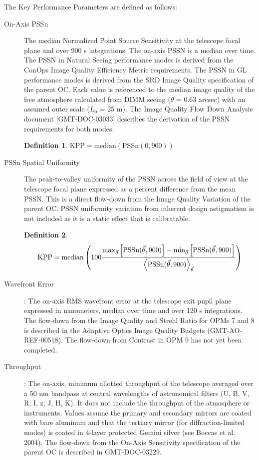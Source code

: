 \documentclass{gmto}
\newtheorem{theorem}{Definition}
\def\median{\ensuremath{\mathrm{median}}}
\begin{document}
The Key Performance Parameters are defined as follows: 
\begin{description}
\item[On-Axis PSSn] The median Normalized Point Source Sensitivity at the telescope focal plane and over 900 s integrations. The
  on-axis PSSN is a median over time. The PSSN in Natural Seeing performance
  modes is derived from the ConOps Image Quality Efficiency Metric requirements.
  The PSSN in GL performance modes is derived from the SRD Image Quality
  specification of the parent OC. Each value is referenced to the median image
  quality of the free atmosphere calculated from DIMM seeing ($\theta$ = 0.63
  arcsec) with an assumed outer scale ($L_0$ = 25 m). The Image Quality Flow
  Down Analysis document $[$GMT-DOC-03033$]$ describes the derivation of the
  PSSN requirements for both modes.
  \begin{theorem}
    $\mathrm{KPP} = \median\left( \mathrm{PSSn}(0,900) \right)$
  \end{theorem}
  
\item[PSSn Spatial Uniformity] The peak-to-valley uniformity of the PSSN across the field of view at the telescope focal plane expressed as a percent difference from the mean PSSN. This is a direct flow-down from the Image Quality Variation of the parent OC. PSSN uniformity variation from inherent design astigmatism is not included as it is a static effect that is calibratable.  
  \begin{theorem}
    \begin{displaymath}
    \mathrm{KPP} = \median\left( 100
      {\max_{\vec\theta}\left[\mathrm{PSSn}(\vec\theta,900)\right]-\min_{\vec\theta}\left[\mathrm{PSSn}(\vec\theta,900)\right]\over\left\langle
       \mathrm{PSSn}(\vec\theta,900) \right\rangle_{\vec\theta}} \right)
    \end{displaymath}
  \end{theorem}

\item[Wavefront Error]: The on-axis RMS wavefront error at the telescope exit pupil plane expressed in nanometers, median over time and over 120 s integrations. The flow-down from the Image Quality and Strehl Ratio for OPMs 7 and 8 is described in the Adaptive Optics Image Quality Budgets (GMT-AO-REF-00518). The flow-down from Contrast in OPM 9 has not yet been completed.  

\item[Throughput]: The on-axis, minimum allotted throughput of the telescope averaged over a 50 nm bandpass at central wavelengths of astronomical filters (U, B, V, R, I, z, J, H, K). It does not include the throughput of the atmosphere or instruments. Values assume the primary and secondary mirrors are coated with bare aluminum and that the tertiary mirror (for diffraction-limited modes) is coated in 4-layer protected Gemini silver (see Boccas et al. 2004). The flow-down from the On-Axis Sensitivity specification of the parent OC is described in GMT-DOC-03229.  


\end{description}
\end{document}
